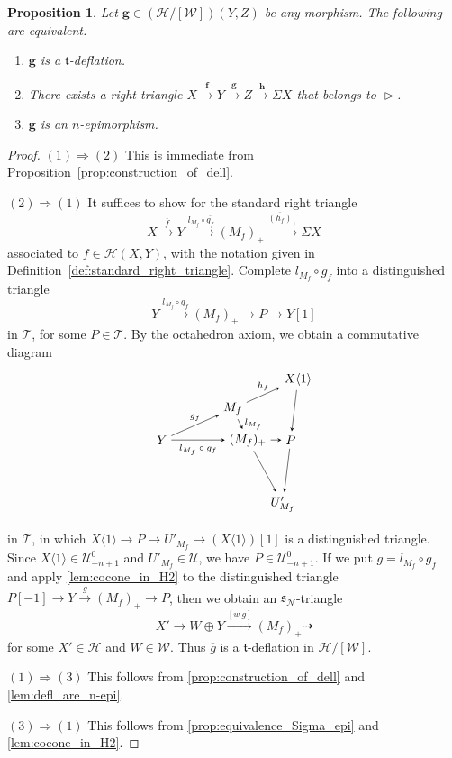 \documentclass[a4paper,reqno,10pt]{amsart}
\newtheorem{proposition}[proposition]{Proposition}
\theoremstyle{definition}
\theoremstyle{definition}
\theoremstyle{definition}
\theoremstyle{definition}
\theoremstyle{plain}
\newcommand{\fs}{\mathfrak{s}}
\newcommand{\ft}{\mathfrak{t}}
\newcommand{\CH}{\mathcal{H}}
\newcommand{\CN}{\mathcal{N}}
\newcommand{\CT}{\mathcal{T}}
\newcommand{\CU}{\mathcal{U}}
\newcommand{\CW}{\mathcal{W}}
\begin{document}
\normalcolor






\begin{proposition}\label{prop:char_def}
Let $\mathbf{g}\in(\CH/[\CW])(Y,Z)$ be any morphism.
The following are equivalent.
\begin{enumerate}
\item $\mathbf{g}$ is a $\ft$-deflation.
\item There exists a right triangle $X\xrightarrow{\mathbf{f}}Y\xrightarrow{\mathbf{g}}Z\xrightarrow{\mathbf{h}}\Sigma X$ that belongs to $\vartriangleright$.
\item %
$\mathbf{g}$ is an $n$-epimorphism.
\normalcolor
\end{enumerate}
\end{proposition}
\begin{proof}
$(1)\Rightarrow(2)$ This is immediate from Proposition~\ref{prop:construction_of_dell}.

$(2)\Rightarrow(1)$ It suffices to show for the standard right triangle
\[
X\xrightarrow{\overline{f}}Y\xrightarrow{\overline{l_{M_f}}\circ \overline{g_f}}(M_f)_+\xrightarrow{\overline{(h_f)}_+}\Sigma X
\]
associated to $f\in\CH(X,Y)$, with the notation given in Definition~\ref{def:standard_right_triangle}.
Complete $l_{M_f}\circ g_f$ into a distinguished triangle
\[
Y\xrightarrow{l_{M_f}\circ g_f}(M_f)_+\to P\to Y[1]
\]
in $\CT$, for some $P\in\CT$.
By the octahedron axiom, we obtain a commutative diagram
\[
\begin{tikzpicture}[>=stealth]
\node (1) at (-2.4,0) {$Y$};
\node (2) at (-0.42,0.88) {$M_f$};
\node (3) at (1.4,1.7) {$X\langle1\rangle$};
\node (4) at (0,0) {$(M_f)_+$};
\node (5) at (1.2,0) {$P$};
\node (6) at (0.98,-1.8) {$U'_{M_f}$};
\draw[->] (1) -- node[above,font=\scriptsize] {$g_f$} (2);
\draw[->] (1) -- node[below,font=\scriptsize] {$l_{M_f}\circ g_f$} (4);
\draw[->] (2) -- node[above,font=\scriptsize] {$h_f$} (3);
\draw[->] (2) -- node[right,font=\scriptsize] {$l_{M_f}$} (4);
\draw[->] (3) -- (5);
\draw[->] (4) -- (5);
\draw[->] (4) -- (6);
\draw[->] (5) -- (6);
\end{tikzpicture}
\]
in $\CT$, in which $X\langle1\rangle\to P\to U'_{M_f}\to (X\langle1\rangle)[1]$ is a distinguished triangle. Since $X\langle1\rangle\in\CU_{-n+1}^0$ and $U'_{M_f}\in\CU$, we have $P\in\CU_{-n+1}^0$.
If we put $g=l_{M_f}\circ g_f$ and apply \cref{lem:cocone_in_H2} to the distinguished triangle $P[-1]\to Y\xrightarrow{g}(M_f)_+\to P$, then we obtain an $\fs_{\CN}$-triangle
\[ X'\to W\oplus Y\xrightarrow{[w\ g]}(M_f)_+\dashrightarrow \]
for some $X'\in\CH$ and $W\in\CW$. Thus $\overline{g}$ is a $\ft$-deflation in $\CH/[\CW]$.

$(1)\Rightarrow(3)$ This follows from \cref{prop:construction_of_dell} and \cref{lem:defl_are_n-epi}. 

$(3)\Rightarrow(1)$ This follows from \cref{prop:equivalence_Sigma_epi} and \cref{lem:cocone_in_H2}.
\normalcolor
\end{proof}
\end{document}
